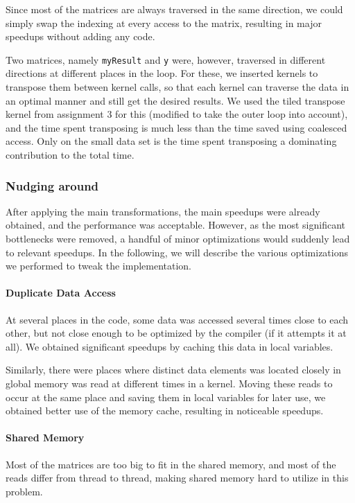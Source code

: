 \documentclass[11pt]{article}
\begin{document}
Since most of the matrices are always traversed in the same direction, we could simply swap the indexing at every access to the matrix, resulting in major speedups without adding any code.

Two matrices, namely \texttt{myResult} and \texttt{y} were, however, traversed in different directions at different places in the loop.
For these, we inserted kernels to transpose them between kernel calls, so that each kernel can traverse the data in an optimal manner and still get the desired results.
We used the tiled transpose kernel from assignment 3 for this (modified to take the outer loop into account), and the time spent transposing is much less than the time saved using coalesced access.
Only on the small data set is the time spent transposing a dominating contribution to the total time.


\subsubsection{Nudging around}

After applying the main transformations, the main speedups were already obtained, and the performance was acceptable.
However, as the most significant bottlenecks were removed, a handful of minor optimizations would suddenly lead to relevant speedups.
In the following, we will describe the various optimizations we performed to tweak the implementation.


\paragraph{Duplicate Data Access\\}
At several places in the code, some data was accessed several times close to each other, but not close enough to be optimized by the compiler (if it attempts it at all).
We obtained significant speedups by caching this data in local variables.

Similarly, there were places where distinct data elements was located closely in global memory was read at different times in a kernel.
Moving these reads to occur at the same place and saving them in local variables for later use, we obtained better use of the memory cache, resulting in noticeable speedups.

\paragraph{Shared Memory\\}
Most of the matrices are too big to fit in the shared memory, and most of the reads differ from thread to thread, making shared memory hard to utilize in this problem.
\end{document}

